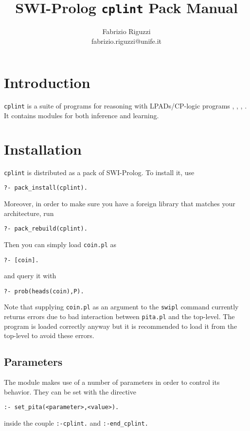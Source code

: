 \documentclass[a4paper,10pt]{article}
\begin{document}
\title{SWI-Prolog \texttt{cplint} Pack Manual}


\author{Fabrizio Riguzzi\\
fabrizio.riguzzi@unife.it}

\maketitle


\section{Introduction}


\texttt{cplint} is a suite of programs for reasoning with LPADs/CP-logic programs  \cite{VenVer03-TR}, \cite{VenVer04-ICLP04-IC},
\cite{VenDenBru-JELIA06},
\cite{DBLP:journals/tplp/VennekensDB09}. It contains modules for both inference and learning.

\section{Installation}
\texttt{cplint} is distributed as a pack of SWI-Prolog. To install it, use
\begin{verbatim}
?- pack_install(cplint).
\end{verbatim}
Moreover, in order to make sure you have a foreign library that matches your architecture, run
\begin{verbatim}
?- pack_rebuild(cplint). 
\end{verbatim}






Then you can simply load \texttt{coin.pl} as
\begin{verbatim}
?- [coin].
\end{verbatim}
and query it with
\begin{verbatim}
?- prob(heads(coin),P).
\end{verbatim}
Note that supplying \texttt{coin.pl} as an argument to the \texttt{swipl} command currently returns errors due to bad interaction between \texttt{pita.pl} and the top-level.
The program is loaded correctly anyway but it is recommended to load it from the top-level to avoid these errors.

\subsection{Parameters}
The module makes use of a number of parameters in order to control its behavior. They can be set with the directive
\begin{verbatim}
:- set_pita(<parameter>,<value>).
\end{verbatim}
inside the couple \texttt{:-cplint.} and \texttt{:-end\_cplint.} 
\end{document}
